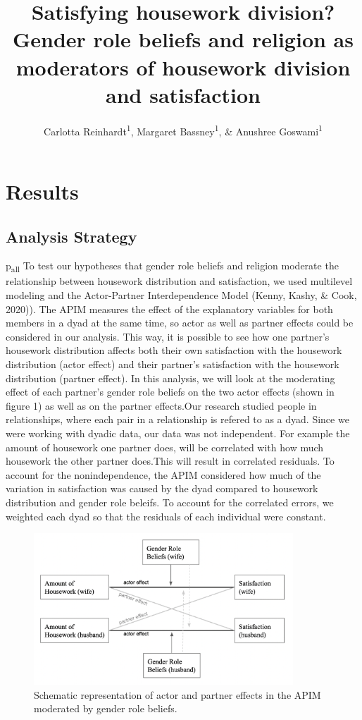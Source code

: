 \documentclass[
  man,floatsintext]{apa6}
\title{Satisfying housework division? Gender role beliefs and religion as moderators of housework division and satisfaction}
\author{Carlotta Reinhardt\textsuperscript{1}, Margaret Bassney\textsuperscript{1}, \& Anushree Goswami\textsuperscript{1}}
\date{}
\affiliation{\vspace{0.5cm}\textsuperscript{1} Smith College}
\begin{document}
\maketitle

\hypertarget{results}{%
\section{Results}\label{results}}

\hypertarget{analysis-strategy}{%
\subsection{Analysis Strategy}\label{analysis-strategy}}

p\textsubscript{all}
To test our hypotheses that gender role beliefs and religion moderate the relationship between housework distribution and satisfaction, we used multilevel modeling and the Actor-Partner Interdependence Model (Kenny, Kashy, \& Cook, 2020)). The APIM measures the effect of the explanatory variables for both members in a dyad at the same time, so actor as well as partner effects could be considered in our analysis. This way, it is possible to see how one partner's housework distribution affects both their own satisfaction with the housework distribution (actor effect) and their partner's satisfaction with the housework distribution (partner effect). In this analysis, we will look at the moderating effect of each partner's gender role beliefs on the two actor effects (shown in figure 1) as well as on the partner effects.Our research studied people in relationships, where each pair in a relationship is refered to as a dyad. Since we were working with dyadic data, our data was not independent. For example the amount of housework one partner does, will be correlated with how much housework the other partner does.This will result in correlated residuals. To account for the nonindependence, the APIM considered how much of the variation in satisfaction was caused by the dyad compared to housework distribution and gender role beleifs. To account for the correlated errors, we weighted each dyad so that the residuals of each individual were constant.



\begin{figure}
\includegraphics[width=3.83in]{APIM} \caption{Schematic representation of actor and partner effects in the APIM moderated by gender role beliefs.}\label{fig:unnamed-chunk-3}
\end{figure}
\end{document}
